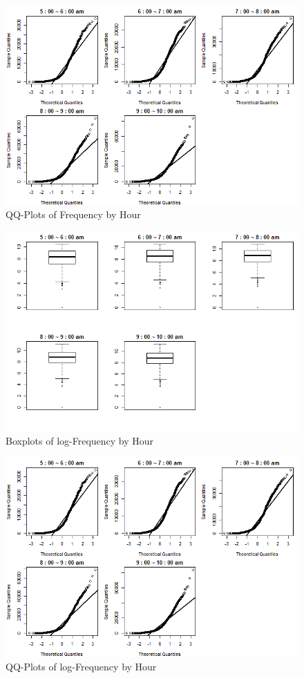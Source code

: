 \documentclass[hidelinks,12pt]{article}
\begin{document}
	\begin{figure}[!ht]
		\includegraphics[width=\textwidth]{qq.png}
		\caption{QQ-Plots of Frequency by Hour \label{fig:qq}}
	\end{figure}
	\begin{figure}[!ht]
		\includegraphics[width=\textwidth]{box_log.png}
		\caption{Boxplots of log-Frequency by Hour \label{fig:lgboxplot}}
	\end{figure}
	\begin{figure}[!ht]
		\includegraphics[width=\textwidth]{qq.png}
		\caption{QQ-Plots of log-Frequency by Hour \label{fig:lgqq}}
	\end{figure}
	
\end{document}
